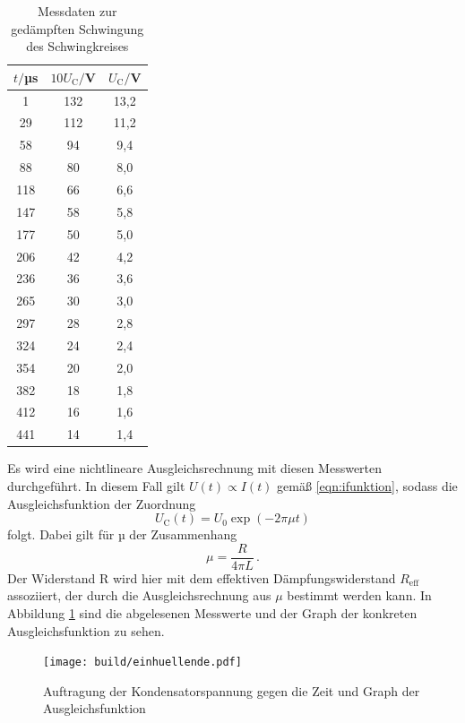 \begin{table}
\centering
\caption{Messdaten zur gedämpften Schwingung des Schwingkreises}
\label{tab:einhuellende}
\begin{tabular}{c c c}
\toprule
$t/$µs & $10U_\mathrm{C}/$V & $U_\mathrm{C}/$V \\
\midrule
  1 & 132 & 13,2 \\
 29 & 112 & 11,2 \\
 58 &  94 &  9,4 \\
 88 &  80 &  8,0 \\
118 &  66 &  6,6 \\
147 &  58 &  5,8 \\
177 &  50 &  5,0 \\
206 &  42 &  4,2 \\
236 &  36 &  3,6 \\
265 &  30 &  3,0 \\
297 &  28 &  2,8 \\
324 &  24 &  2,4 \\
354 &  20 &  2,0 \\
382 &  18 &  1,8 \\
412 &  16 &  1,6 \\
441 &  14 &  1,4 \\
\bottomrule
\end{tabular}
\end{table}

Es wird eine nichtlineare Ausgleichsrechnung mit diesen Messwerten durchgeführt.
In diesem Fall gilt $U(t) \propto I(t)$ gemäß \eqref{eqn:ifunktion}, sodass die
Ausgleichsfunktion der Zuordnung
\begin{equation}
  U_\text{C}(t) = U_0 \exp(-2 \pi \mu t)
\end{equation}
folgt. Dabei gilt für µ der Zusammenhang
\begin{equation}
  \mu = \frac{R}{4 \pi L}\,.
  \label{eqn:mu}
\end{equation}
Der Widerstand R wird hier mit dem effektiven Dämpfungswiderstand $R_\text{eff}$ assoziiert, der
durch die Ausgleichsrechnung aus $\mu$ bestimmt werden kann.
In Abbildung \ref{fig:einhuellendefit} sind die abgelesenen Messwerte und der Graph
der konkreten Ausgleichsfunktion zu sehen.

\begin{figure}
  \centering
  \texttt{[image: build/einhuellende.pdf]}
  \caption{Auftragung der Kondensatorspannung gegen die Zeit und Graph der Ausgleichsfunktion}
  \label{fig:einhuellendefit}
\end{figure}

